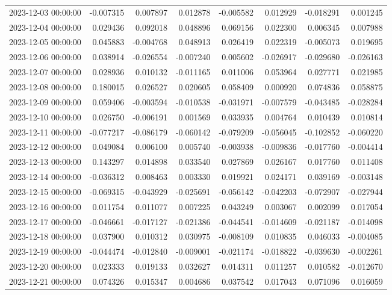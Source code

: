 \begin{tabular}{lrrrrrrr}
2023-12-03 00:00:00 & -0.007315 & 0.007897 & 0.012878 & -0.005582 & 0.012929 & -0.018291 & 0.001245 \\
2023-12-04 00:00:00 & 0.029436 & 0.092018 & 0.048896 & 0.069156 & 0.022300 & 0.006345 & 0.007988 \\
2023-12-05 00:00:00 & 0.045883 & -0.004768 & 0.048913 & 0.026419 & 0.022319 & -0.005073 & 0.019695 \\
2023-12-06 00:00:00 & 0.038914 & -0.026554 & -0.007240 & 0.005602 & -0.026917 & -0.029680 & -0.026163 \\
2023-12-07 00:00:00 & 0.028936 & 0.010132 & -0.011165 & 0.011006 & 0.053964 & 0.027771 & 0.021985 \\
2023-12-08 00:00:00 & 0.180015 & 0.026527 & 0.020605 & 0.058409 & 0.000920 & 0.074836 & 0.058875 \\
2023-12-09 00:00:00 & 0.059406 & -0.003594 & -0.010538 & -0.031971 & -0.007579 & -0.043485 & -0.028284 \\
2023-12-10 00:00:00 & 0.026750 & -0.006191 & 0.001569 & 0.033935 & 0.004764 & 0.010439 & 0.010814 \\
2023-12-11 00:00:00 & -0.077217 & -0.086179 & -0.060142 & -0.079209 & -0.056045 & -0.102852 & -0.060220 \\
2023-12-12 00:00:00 & 0.049084 & 0.006100 & 0.005740 & -0.003938 & -0.009836 & -0.017760 & -0.004414 \\
2023-12-13 00:00:00 & 0.143297 & 0.014898 & 0.033540 & 0.027869 & 0.026167 & 0.017760 & 0.011408 \\
2023-12-14 00:00:00 & -0.036312 & 0.008463 & 0.003330 & 0.019921 & 0.024171 & 0.039169 & -0.003148 \\
2023-12-15 00:00:00 & -0.069315 & -0.043929 & -0.025691 & -0.056142 & -0.042203 & -0.072907 & -0.027944 \\
2023-12-16 00:00:00 & 0.011754 & 0.011077 & 0.007225 & 0.043249 & 0.003067 & 0.002099 & 0.017054 \\
2023-12-17 00:00:00 & -0.046661 & -0.017127 & -0.021386 & -0.044541 & -0.014609 & -0.021187 & -0.014098 \\
2023-12-18 00:00:00 & 0.037900 & 0.010312 & 0.030975 & -0.008109 & 0.010835 & 0.046033 & -0.004085 \\
2023-12-19 00:00:00 & -0.044474 & -0.012840 & -0.009001 & -0.021174 & -0.018822 & -0.039630 & -0.002261 \\
2023-12-20 00:00:00 & 0.023333 & 0.019133 & 0.032627 & 0.014311 & 0.011257 & 0.010582 & -0.012670 \\
2023-12-21 00:00:00 & 0.074326 & 0.015347 & 0.004686 & 0.037542 & 0.017043 & 0.071096 & 0.016059 \\

\end{tabular}
